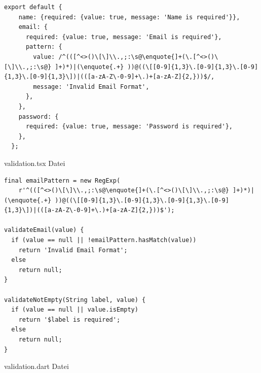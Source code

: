 \begin{listing}[H]
	\label{lst:quelltext2}

    \begin{verbatim}
export default {
	name: {required: {value: true, message: 'Name is required'}},
	email: {
	  required: {value: true, message: 'Email is required'},
	  pattern: {
		value: /^(([^<>()\[\]\\.,;:\s@\enquote{]+(\.[^<>()\[\]\\.,;:\s@} ]+)*)|(\enquote{.+} ))@((\[[0-9]{1,3}\.[0-9]{1,3}\.[0-9]{1,3}\.[0-9]{1,3}\])|(([a-zA-Z\-0-9]+\.)+[a-zA-Z]{2,}))$/,
		message: 'Invalid Email Format',
	  },
	},
	password: {
	  required: {value: true, message: 'Password is required'},
	},
  };
    \end{verbatim}

    \caption[validation.tsx]{validation.tsx Datei}
\end{listing}


\begin{listing}[H]
	\label{lst:quelltext3}

    \begin{verbatim}
final emailPattern = new RegExp(
	r'^(([^<>()\[\]\\.,;:\s@\enquote{]+(\.[^<>()\[\]\\.,;:\s@} ]+)*)|(\enquote{.+} ))@((\[[0-9]{1,3}\.[0-9]{1,3}\.[0-9]{1,3}\.[0-9]{1,3}\])|(([a-zA-Z\-0-9]+\.)+[a-zA-Z]{2,}))$');

validateEmail(value) {
  if (value == null || !emailPattern.hasMatch(value))
	return 'Invalid Email Format';
  else
	return null;
}

validateNotEmpty(String label, value) {
  if (value == null || value.isEmpty)
	return '$label is required';
  else
	return null;
}		
    \end{verbatim}

    \caption[validation.dart]{validation.dart Datei}
\end{listing}


